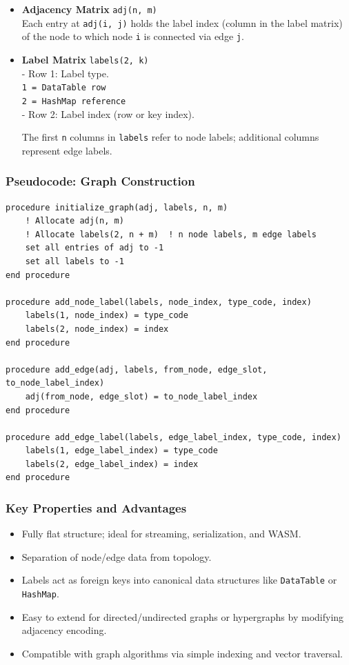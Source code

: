 \documentclass{article}
\begin{document}
\begin{itemize}
  \item \textbf{Adjacency Matrix} \quad \texttt{adj(n, m)} \\
    Each entry at \texttt{adj(i, j)} holds the label index (column in the label matrix) of the node to which node \texttt{i} is connected via edge \texttt{j}.
  \item \textbf{Label Matrix} \quad \texttt{labels(2, k)} \\
    - Row 1: Label type.\\
    \hspace*{1.5em} \texttt{1 = DataTable row} \\
    \hspace*{1.5em} \texttt{2 = HashMap reference} \\
    - Row 2: Label index (row or key index).

    The first \texttt{n} columns in \texttt{labels} refer to node labels; additional columns represent edge labels.
\end{itemize}

\subsubsection{Pseudocode: Graph Construction}

\begin{verbatim}
procedure initialize_graph(adj, labels, n, m)
    ! Allocate adj(n, m)
    ! Allocate labels(2, n + m)  ! n node labels, m edge labels
    set all entries of adj to -1
    set all labels to -1
end procedure

procedure add_node_label(labels, node_index, type_code, index)
    labels(1, node_index) = type_code
    labels(2, node_index) = index
end procedure

procedure add_edge(adj, labels, from_node, edge_slot, to_node_label_index)
    adj(from_node, edge_slot) = to_node_label_index
end procedure

procedure add_edge_label(labels, edge_label_index, type_code, index)
    labels(1, edge_label_index) = type_code
    labels(2, edge_label_index) = index
end procedure
\end{verbatim}

\subsubsection{Key Properties and Advantages}

\begin{itemize}
  \item Fully flat structure; ideal for streaming, serialization, and WASM.
  \item Separation of node/edge data from topology.
  \item Labels act as foreign keys into canonical data structures like \texttt{DataTable} or \texttt{HashMap}.
  \item Easy to extend for directed/undirected graphs or hypergraphs by modifying adjacency encoding.
  \item Compatible with graph algorithms via simple indexing and vector traversal.
\end{itemize}
\end{document}
